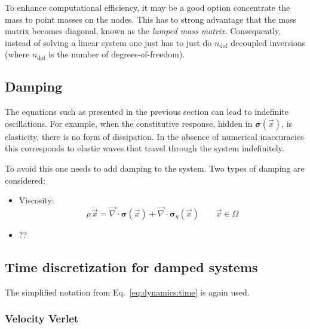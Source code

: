 \documentclass[times,namecite]{goose-article}
\begin{document}
To enhance computational efficiency, it may be a good option concentrate the mass to point masses on the nodes. This has to strong advantage that the mass matrix becomes diagonal, known as the \emph{lumped mass matrix}. Consequently, instead of solving a linear system one just has to just do $n_\mathrm{dof}$ decoupled inversions (where $n_\mathrm{dof}$ is the number of degrees-of-freedom).

\subsection{Damping}

The equations such as presented in the previous section can lead to indefinite oscillations. For example, when the constitutive response, hidden in $\bm{\sigma}(\vec{x})$, is elasticity, there is no form of dissipation. In the absence of numerical inaccuracies this corresponds to elastic waves that travel through the system indefinitely.

To avoid this one needs to add damping to the system. Two types of damping are considered:

\begin{itemize}
  \item Viscosity:
  \begin{equation}
    \rho\, \ddot{\vec{x}}
    =
    \vec{\nabla} \cdot
    \bm{\sigma}(\vec{x})
    + \vec{\nabla} \cdot \bm{\sigma}_\eta (\vec{x})
    \qquad
    \vec{x} \in \Omega
  \end{equation}
  \item ??
\end{itemize}

\subsection{Time discretization for damped systems}

The simplified notation from Eq.~\ref{eq:dynamics:time} is again used.

\subsubsection{Velocity Verlet}
\end{document}
